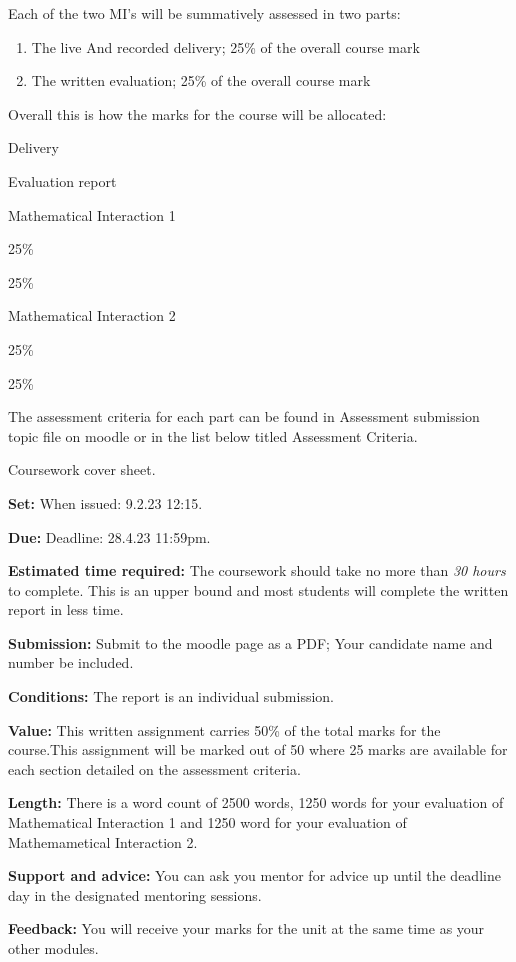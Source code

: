 \documentclass[
]{book}
\begin{document}
Each of the two MI's will be summatively assessed in two parts:

\begin{enumerate}
\def\labelenumi{\Alph{enumi})}
\item
  The live And recorded delivery; 25\% of the overall course mark
\item
  The written evaluation; 25\% of the overall course mark
\end{enumerate}

Overall this is how the marks for the course will be allocated:

Delivery

Evaluation report

Mathematical Interaction 1

25\%

25\%

Mathematical Interaction 2

25\%

25\%

The assessment criteria for each part can be found in Assessment submission topic file on moodle or in the list below titled Assessment Criteria.

Coursework cover sheet.

\textbf{Set:} When issued: 9.2.23 12:15.

\textbf{Due:} Deadline: 28.4.23 11:59pm.

\textbf{Estimated time required:} The coursework should take no more than \emph{30 hours} to complete. This is an upper bound and most students will complete the written report in less time.

\textbf{Submission:} Submit to the moodle page as a PDF; Your candidate name and number be included.

\textbf{Conditions:} The report is an individual submission.

\textbf{Value:} This written assignment carries 50\% of the total marks for the course.This assignment will be marked out of 50 where 25 marks are available for each section detailed on the assessment criteria.

\textbf{Length:} There is a word count of 2500 words, 1250 words for your evaluation of Mathematical Interaction 1 and 1250 word for your evaluation of Mathemametical Interaction 2.

\textbf{Support and advice:} You can ask you mentor for advice up until the deadline day in the designated mentoring sessions.

\textbf{Feedback:} You will receive your marks for the unit at the same time as your other modules.
\end{document}
